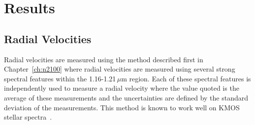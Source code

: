 


\section{Results} %
\label{sec:ngc55results}

\subsection{Radial Velocities} %
\label{sub:rvs}
Radial velocities are measured using the method described first in Chapter~\ref{ch:n2100} where radial velocities are measured using several strong spectral features within the 1.16-1.21\,$\mu$m region.
Each of these spectral features is independently used to measure a radial velocity where the value quoted is the average of these measurements and the uncertainties are defined by the standard deviation of the measurements.
This method is known to work well on KMOS stellar spectra~\cite{2015ApJ...798...23L,2015ApJ...803...14P,2016arXiv160202702P}.

